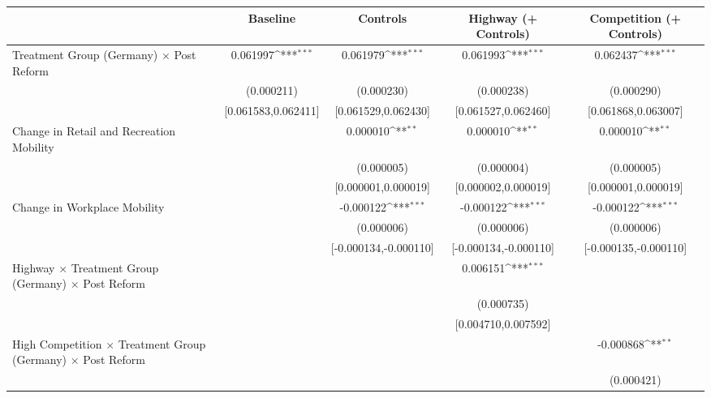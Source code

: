 {
\def\sym#1{\ifmmode^{#1}\else\(^{#1}\)\fi}
\begin{tabular}{l*{4}{c}}
\toprule
                    &\multicolumn{1}{c}{Baseline}&\multicolumn{1}{c}{Controls}&\multicolumn{1}{c}{Highway (+ Controls)}&\multicolumn{1}{c}{Competition (+ Controls)}\\
\midrule
Treatment Group (Germany) $\times$ Post Reform&    0.061997\sym{***}&    0.061979\sym{***}&    0.061993\sym{***}&    0.062437\sym{***}\\
                    &  (0.000211)         &  (0.000230)         &  (0.000238)         &  (0.000290)         \\
                    &[0.061583,0.062411]         &[0.061529,0.062430]         &[0.061527,0.062460]         &[0.061868,0.063007]         \\
Change in Retail and Recreation Mobility&                     &    0.000010\sym{**} &    0.000010\sym{**} &    0.000010\sym{**} \\
                    &                     &  (0.000005)         &  (0.000004)         &  (0.000005)         \\
                    &                     &[0.000001,0.000019]         &[0.000002,0.000019]         &[0.000001,0.000019]         \\
Change in Workplace Mobility&                     &   -0.000122\sym{***}&   -0.000122\sym{***}&   -0.000122\sym{***}\\
                    &                     &  (0.000006)         &  (0.000006)         &  (0.000006)         \\
                    &                     &[-0.000134,-0.000110]         &[-0.000134,-0.000110]         &[-0.000135,-0.000110]         \\
Highway $\times$ Treatment Group (Germany) $\times$ Post Reform&                     &                     &    0.006151\sym{***}&                     \\
                    &                     &                     &  (0.000735)         &                     \\
                    &                     &                     &[0.004710,0.007592]         &                     \\
High Competition $\times$ Treatment Group (Germany) $\times$ Post Reform&                     &                     &                     &   -0.000868\sym{**} \\
                    &                     &                     &                     &  (0.000421)         \\

\end{tabular}}
